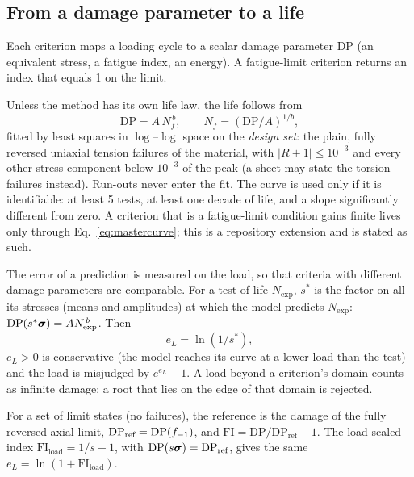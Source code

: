 \subsection{From a damage parameter to a life}\label{sec:mastercurve}

 Each criterion maps a loading cycle to a scalar damage parameter
$\mathrm{DP}$ (an equivalent stress, a fatigue index, an energy). A fatigue-limit criterion
returns an index that equals 1 on the limit.

 Unless the method has its own life law, the life follows from
\begin{equation}
\mathrm{DP} = A\,N_f^{\,b},\qquad N_f = (\mathrm{DP}/A)^{1/b},
\label{eq:mastercurve}
\end{equation}
fitted by least squares in $\log$--$\log$ space on the \emph{design set}: the plain, fully reversed
uniaxial tension failures of the material, with $|R+1|\le 10^{-3}$ and every other stress
component below $10^{-3}$ of the peak (a sheet may state the torsion failures instead). Run-outs
never enter the fit. The curve is used only if it is identifiable: at least 5 tests, at least one
decade of life, and a slope significantly different from zero. A criterion that is a fatigue-limit
condition gains finite lives only through Eq.~\eqref{eq:mastercurve}; this is a repository
extension and is stated as such.

 The error of a prediction is measured on the load, so that criteria
with different damage parameters are comparable. For a test of life $N_\text{exp}$, $s^*$ is the
factor on all its stresses (means and amplitudes) at which the model predicts $N_\text{exp}$:
$\mathrm{DP}(s^*\boldsymbol\sigma) = A N_\text{exp}^{\,b}$. Then
\begin{equation}
e_L = \ln(1/s^*) ,
\label{eq:eload}
\end{equation}
$e_L>0$ is conservative (the model reaches its curve at a lower load than the test) and the load is
misjudged by $e^{e_L}-1$. A load beyond a criterion's domain counts as infinite damage; a root that
lies on the edge of that domain is rejected.

 For a set of limit states (no failures), the reference is the
damage of the fully reversed axial limit, $\mathrm{DP}_\text{ref}=\mathrm{DP}(f_{-1})$, and
$\mathrm{FI} = \mathrm{DP}/\mathrm{DP}_\text{ref}-1$. The load-scaled index $\mathrm{FI}_\text{load}=1/s-1$,
with $\mathrm{DP}(s\boldsymbol\sigma)=\mathrm{DP}_\text{ref}$, gives the same $e_L=\ln(1+\mathrm{FI}_\text{load})$.

